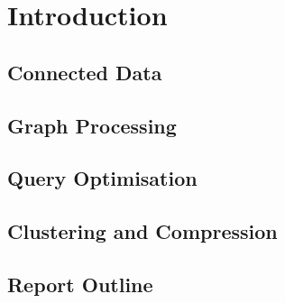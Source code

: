 \chapter{Introduction}

\section{Connected Data}

\section{Graph Processing}

\section{Query Optimisation}

\section{Clustering and Compression}

\section{Report Outline}
